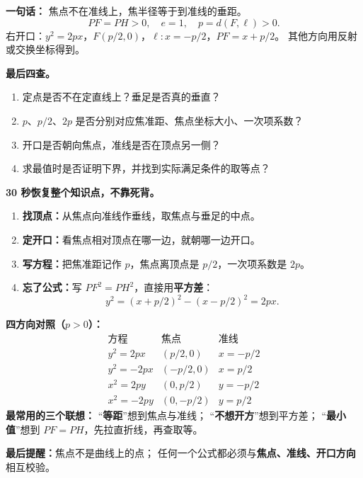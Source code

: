\begin{summarybox}
\textbf{一句话：} 焦点不在准线上，焦半径等于到准线的垂距。
\[
PF=PH>0,\quad e=1,\quad p=d(F,\ell)>0.
\]
右开口：$y^2=2px$，$F(p/2,0)$，$\ell:x=-p/2$，$PF=x+p/2$。
其他方向用反射或交换坐标得到。

\textbf{最后四查。}
\begin{enumerate}[leftmargin=*]
\item 定点是否不在定直线上？垂足是否真的垂直？
\item $p$、$p/2$、$2p$ 是否分别对应焦准距、焦点坐标大小、一次项系数？
\item 开口是否朝向焦点，准线是否在顶点另一侧？
\item 求最值时是否证明下界，并找到实际满足条件的取等点？
\end{enumerate}
\end{summarybox}

\clearpage
\begin{summarybox}
\textbf{30 秒恢复整个知识点，不靠死背。}
\begin{enumerate}[leftmargin=*]
\item \textbf{找顶点：}从焦点向准线作垂线，取焦点与垂足的中点。
\item \textbf{定开口：}看焦点相对顶点在哪一边，就朝哪一边开口。
\item \textbf{写方程：}把焦准距记作 $p$，焦点离顶点是 $p/2$，一次项系数是 $2p$。
\item \textbf{忘了公式：}写 $PF^2=PH^2$，直接用\textbf{平方差}：
\[
y^2=(x+p/2)^2-(x-p/2)^2=2px.
\]
\end{enumerate}
\textbf{四方向对照（$p>0$）：}
\[
\begin{array}{c|c|c}
\text{方程} & \text{焦点} & \text{准线} \\ \hline
y^2=2px & (p/2,0) & x=-p/2 \\
y^2=-2px & (-p/2,0) & x=p/2 \\
x^2=2py & (0,p/2) & y=-p/2 \\
x^2=-2py & (0,-p/2) & y=p/2
\end{array}
\]
\textbf{最常用的三个联想：}
“\textbf{等距}”想到焦点与准线；
“\textbf{不想开方}”想到平方差；
“\textbf{最小值}”想到 $PF=PH$，先拉直折线，再查取等。

\textbf{最后提醒：}焦点不是曲线上的点；
任何一个公式都必须与\textbf{焦点、准线、开口方向}相互校验。
\end{summarybox}
